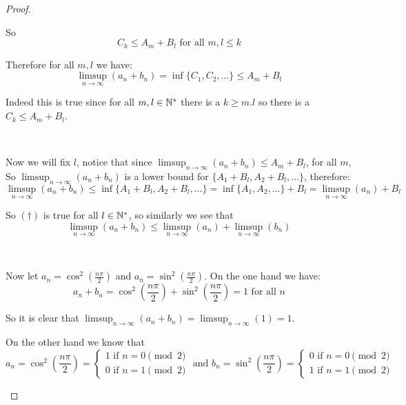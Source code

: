 \begin{exercise}
\begin{proof}
\begin{enumerate}[label = (\alph*)]
                So \begin{equation*}
                    C_k\leq A_m+B_l \text{ for all }m,l\leq k
                \end{equation*}

                Therefore for all $m,l$ we have:\[
                    \limsup_{n\rightarrow \infty}(a_n+b_n) = \inf\{C_1,C_2,\ldots\} \leq A_m + B_l    
                \]

                Indeed this is true since for all $m,l\in \mathbb{N}^\ast$ there is a $k\geq m.l$ so there is a $C_k\leq A_m+B_l$.

                \

                Now we will fix $l$, notice that since $\limsup_{n\rightarrow \infty}(a_n+b_n) \leq A_m + B_l$, for all $m$, So $\limsup_{n\rightarrow \infty}(a_n+b_n)$ is a lower bound for $\{A_1+B_l,A_2+B_l,\ldots\}$, therefore:\begin{equation*}
                    \limsup_{n\rightarrow \infty}(a_n+b_n) \leq \inf\{A_1+B_l,A_2+B_l,\ldots\} = \inf\{A_1,A_2,\ldots\} + B_l = \limsup_{n\rightarrow \infty}(a_n)+B_l \tag{$\dagger$}
                \end{equation*}

                So $(\dagger)$ is true for all $l\in \mathbb{N}^\ast$, so similarly we see that  \[
                \limsup_{n\rightarrow \infty}(a_n+b_n) \leq \limsup_{n\rightarrow \infty}(a_n)+\limsup_{n\rightarrow \infty}(b_n)
               \]

                \

                Now let $a_n = \cos^2(\frac{n\pi}{2})$ and $a_n = \sin^2(\frac{n\pi}{2})$. On the one hand we have:\[a_n+b_n =\cos^2(\frac{n\pi}{2}) + \sin^2(\frac{n\pi}{2}) = 1\text{ for all }n \]

                So it is clear that $\limsup_{n\rightarrow \infty}(a_n+b_n) = \limsup_{n\rightarrow \infty}(1) = 1$.

                On the other hand we know that \[a_n = \cos^2(\frac{n\pi}{2}) = \begin{cases}
                    1 \text{ if }n = 0\pmod 2\\
                    0 \text{ if }n = 1\pmod 2
                \end{cases}\text{ and }b_n = \sin^2(\frac{n\pi}{2}) = \begin{cases}
                    0 \text{ if }n = 0\pmod 2\\
                    1 \text{ if }n = 1\pmod 2
                \end{cases}\]


\end{enumerate}
\end{proof}
\end{exercise}
